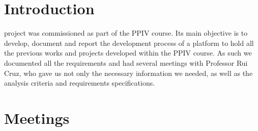 \documentclass[a4paper,12pt,journal,twoside,compsoc]{PPIEEEtran}
\begin{document}

\maketitle

\IEEEdisplaynontitleabstractindextext
\IEEEpeerreviewmaketitle
\section{Introduction}
% 
% 
 project was commissioned as part of the PPIV course. Its main objective is to develop, document and report the development process of a platform to hold all the previous works and projects developed within the PPIV course. As such we documented all the requirements and had several meetings with Professor Rui Cruz, who gave us not only the necessary information we needed, as well as the analysis criteria and requirements specifications.


\section{Meetings}
\end{document}
